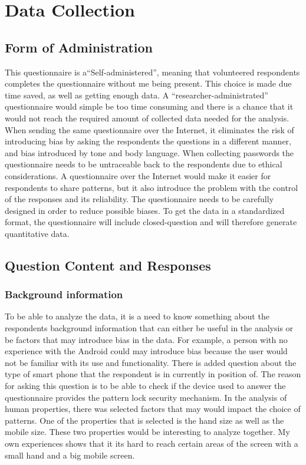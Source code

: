 \section{Data Collection} \label{sec:datacollection}


  \subsection{Form of Administration} \label{sec:formodadministration}

    This questionnaire is a``Self-administered'', meaning that volunteered respondents completes the questionnaire without me being present. This choice is made due time saved, as well as getting enough data. A ``researcher-administrated'' questionnaire would simple be too time consuming and there is a chance that it would not reach the required amount of collected data needed for the analysis. When sending the same questionnaire over the Internet, it eliminates the risk of introducing bias by asking the respondents the questions in a different manner, and bias introduced by tone and body language. When collecting passwords the questionnaire needs to be untraceable back to the respondents due to ethical considerations. A questionnaire over the Internet would make it easier for respondents to share patterns, but it also introduce the problem with the control of the responses and its reliability. The questionnaire needs to be carefully designed in order to reduce possible biases. To get the data in a standardized format, the questionnaire will include closed-question and will therefore generate quantitative data. 

  \subsection{Question Content and Responses}\label{sec:questions}

    \subsubsection*{Background information}
    To be able to analyze the data, it is a need to know something about the respondents background information that can either be useful in the analysis or be factors that may introduce bias in the data. For example, a person with no experience with the Android could may introduce bias because the user would not be familiar with its use and functionality. There is added question about the type of smart phone that the respondent is in currently in position of. The reason for asking this question is to be able to  check if the device used to answer the questionnaire provides the pattern lock security mechanism. In the analysis of human properties, there was selected factors that may would impact the choice of patterns. One of the properties that is selected is the hand size as well as the mobile size. These two properties would be interesting to analyze together. My own experiences shows that it its hard to reach certain areas of the screen with a small hand and a big mobile screen. \\

